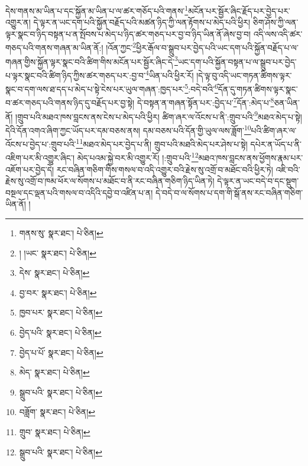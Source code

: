 དེས་གནས་མ་ཡིན་པ་དང་སྐྱོན་མ་ཡིན་པ་ལ་ཚར་གཅོད་པའི་གནས་\footnote{གནས་སུ་  སྣར་ཐང་།  པེ་ཅིན། }མངོན་པར་སྦྱོར་ཞིང་རྗོད་པར་བྱེད་པར་འགྱུར་ན། དེ་ལྟར་ན་ཡང་དག་པའི་སྐྱོན་བརྗོད་པའི་མཚན་ཉིད་ཀྱི་ལན་རྟོགས་པ་མེད་པའི་ཕྱིར། ཅིག་ཤོས་ཀྱི་ལན་ལྟར་སྣང་བ་ཉིད་བསྟན་པ་ན་སྤོབས་པ་མེད་པ་ཉིད་ཚར་གཅད་པར་བྱ་བ་ཉིད་ཡིན་ནོ་ཞེས་བྱ་བ། འདི་ལས་འདི་ཚར་གཅད་པའི་གནས་གཞན་མ་ཡིན་ནོ:། །འོན་ཀྱང་\footnote{། །ཡང་  སྣར་ཐང་།  པེ་ཅིན། }ཕྱིར་རྒོལ་བ་སྒྲུབ་པར་བྱེད་པའི་ཡང་དག་པའི་སྐྱོན་བརྗོད་པ་ལ་གཞན་གྱིས་སྐྱོན་ལྟར་སྣང་བའི་ཚིག་གིས་མངོན་པར་སྦྱོར་ཞིང་དེ་\footnote{དེས་  སྣར་ཐང་།  པེ་ཅིན། }ཡང་དག་པའི་སྐྱོན་བསྟན་པ་ལ་སྒྲུབ་པར་བྱེད་པ་ལྟར་སྣང་བའི་ཚིག་ཉིད་ཀྱིས་ཚར་གཅད་པར་:བྱ་བ་\footnote{བྱ་བར་  སྣར་ཐང་།  པེ་ཅིན། }ཡིན་པའི་ཕྱིར་རོ། །དེ་ལྟ་བུ་འདི་ཡང་གཏན་ཚིགས་ལྟར་སྣང་བ་དག་ལས་ཐ་དད་པ་མེད་པ་སྟེ་ངེས་པར་ཡུལ་གཞན་:ཁྱད་པར་\footnote{ཁྱབ་པར་  སྣར་ཐང་།  པེ་ཅིན། }:བདེ་བའི་\footnote{བྱེད་པའི་  སྣར་ཐང་།  པེ་ཅིན། }དོན་དུ་གཏན་ཚིགས་ལྟར་སྣང་བ་ཚར་གཅད་པའི་གནས་ཉིད་དུ་བརྗོད་པར་བྱ་སྟེ། དེ་བསྟན་ན་གཞན་སྟོན་པར་:བྱེད་པ་\footnote{བྱེད་པ་པོ་  སྣར་ཐང་།  པེ་ཅིན། }དོན་:མེད་པ་\footnote{མེད་  སྣར་ཐང་།  པེ་ཅིན། }ཅན་ཡིན་ནོ། །གྲུབ་པའི་མཐའ་ཁས་བླངས་ནས་ངེས་པ་མེད་པའི་ཕྱིར། ཚིག་ཞར་ལ་འོངས་པ་ནི་:གྲུབ་པའི་\footnote{སྒྲུབ་པའི་  སྣར་ཐང་།  པེ་ཅིན། }མཐའ་མེད་པ་སྟེ། དེའི་དོན་འགའ་ཞིག་ཀྱང་ཡོད་པར་དམ་བཅས་ནས། དམ་བཅས་པའི་དོན་གྱི་ཡུལ་ལས་ཟློག་\footnote{བཟློག་  སྣར་ཐང་།  པེ་ཅིན། }པའི་ཚིག་ཞར་ལ་འོངས་པ་བྱེད་པ་:གྲུབ་པའི་\footnote{གྲུབ་  སྣར་ཐང་།  པེ་ཅིན། }མཐའ་མེད་པར་བྱེད་པ་ནི། གྲུབ་པའི་མཐའི་མེད་པར་ཤེས་པ་སྟེ། དཔེར་ན་ཡོད་པ་ནི་འཇིག་པར་མི་འགྱུར་ཞིང་། མེད་པའམ་སྐྱེ་བར་མི་འགྱུར་རོ། །:གྲུབ་པའི་\footnote{སྒྲུབ་པའི་  སྣར་ཐང་།  པེ་ཅིན། }མཐའ་ཁས་བླངས་ནས་ཕྱོགས་རྣམ་པར་འཇོག་པར་བྱེད་དེ། རང་བཞིན་གཅིག་གིས་གསལ་བ་འདི་འགྱུར་བའི་རྗེས་སུ་འགྲོ་བ་མཐོང་བའི་ཕྱིར་ཏེ། འཇི་བའི་རྗེས་སུ་འགྲོ་བ་ཁམ་ཕོར་ལ་སོགས་པ་མཐོང་བ་ནི་རང་བཞིན་གཅིག་ཉིད་ཡིན་ཏེ། དེ་ལྟར་ན་ཡང་བདེ་བ་དང་སྡུག་བསྔལ་དང་ལྡན་པའི་གསལ་བ་འདིའི་དབྱེ་བ་འཛིན་པ་ན། དེ་བདེ་བ་ལ་སོགས་པ་དག་གི་སྒོ་ནས་རང་བཞིན་གཅིག་ཡིན་ནོ། །
